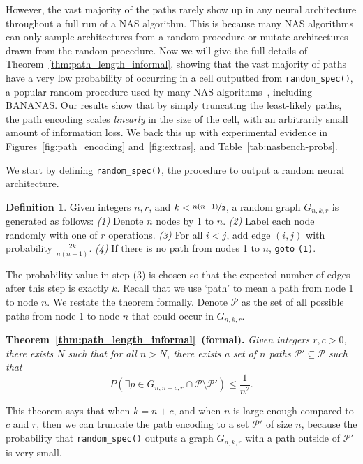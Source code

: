 \documentclass[11pt]{article}
\numberwithin{equation}{section}
\numberwithin{figure}{section}
\theoremstyle{plain}
\theoremstyle{definition}
\newtheorem{definition}[theorem]{Definition}
\begin{document}
However, the vast majority of the paths rarely show up in any neural architecture 
throughout a full run of a NAS algorithm.
This is because many NAS algorithms can only sample architectures from a random
procedure or mutate architectures drawn from the random procedure.
Now we will give the full details of Theorem~\ref{thm:path_length_informal},
showing that the vast majority of paths
have a very low probability of occurring in a cell outputted from \texttt{random\_spec()}, 
a popular random procedure used by many NAS algorithms~\cite{nasbench},
including BANANAS.
Our results show that by simply truncating the least-likely paths,
the path encoding scales \emph{linearly} in the size of the cell,
with an arbitrarily small amount of information loss.
We back this up with experimental evidence in 
Figures~\ref{fig:path_encoding} and~\ref{fig:extras}, and 
Table~\ref{tab:nasbench-probs}.


We start by defining \texttt{random\_spec()}, the procedure to output a random
neural architecture.


\begin{definition}
\label{def:random_graph}
Given integers $n, r$, and $k<\nicefrac{n(n-1)}{2}$,
a random graph $G_{n, k, r}$ is generated as follows:
\emph{(1)} Denote $n$ nodes by 1 to $n$. 
\emph{(2)} Label each node randomly with one of $r$ operations.
\emph{(3)} For all $i<j$, add edge $(i,j)$ with probability $\frac{2k}{n(n-1)}$.
\emph{(4)} If there is no path from nodes 1 to $n$, \texttt{goto} \texttt{(1)}.
\end{definition}


The probability value in step (3) is chosen so that the expected
number of edges after this step is exactly $k$.
Recall that we use `path' to mean a path from node 1
to node $n$.
We restate the theorem formally.
Denote $\mathcal{P}$ as the set of all possible paths from 
node 1 to node $n$ that could occur in $G_{n,k,r}$. 


\noindent\textbf{Theorem~\ref{thm:path_length_informal}~(formal).}
\emph{
Given integers $r, c>0$, there exists $N$ such that for all
$n>N$, there exists a set of $n$ paths  $\mathcal{P}'\subseteq \mathcal{P}$
such that
\begin{equation*}
P(\exists p\in G_{n,n+c,r}\cap\mathcal{P}\setminus\mathcal{P}')\leq \frac{1}{n^{2}}.
\end{equation*}
}

This theorem says that when $k=n+c$, and when $n$ is large enough
compared to $c$ and $r$,
then we can truncate the path encoding to a set 
$\mathcal{P}'$ of size $n$, 
because the probability that \texttt{random\_spec()} 
outputs a graph $G_{n, k, r}$ 
with a path outside of $\mathcal{P}'$ is very small.
\end{document}
